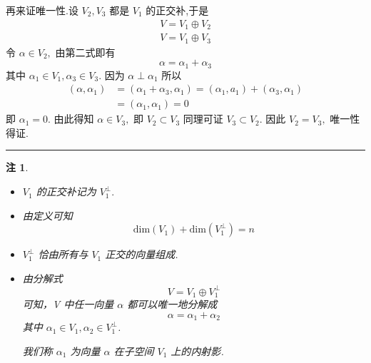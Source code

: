 \documentclass[13pt]{beamer}
\newtheorem*{rem}{注}
\def\qed{\nopagebreak\hfill{\rule{4pt}{7pt}}\medbreak}
\begin{document}
\begin{frame}
再来证唯一性.设 $V_{2}, V_{3}$ 都是 $V_{1}$ 的正交补,于是
\[
\begin{array}{l}
V=V_{1} \oplus V_{2} \\
V=V_{1} \oplus V_{3}
\end{array}
\]
令 ${\alpha} \in V_{2},$ 由第二式即有
\[
{\alpha}={\alpha}_{1}+{\alpha}_{3}
\]
其中 ${\alpha}_{1} \in V_{1}, {\alpha}_{3} \in V_{3} .$ 因为 ${\alpha} \perp {\alpha}_{1}$ 所以
\[
\begin{aligned}
\left({\alpha}, {\alpha}_{1}\right) &=\left({\alpha}_{1}+{\alpha}_{3}, {\alpha}_{1}\right)=\left({\alpha}_{1}, {a}_{1}\right)+\left({\alpha}_{3}, {\alpha}_{1}\right) \\
&=\left({\alpha}_{1}, {\alpha}_{1}\right)=0
\end{aligned}
\]
即 ${\alpha}_{1}={0}$. 
由此得知 ${\alpha} \in V_{3},$ 即 $V_{2} \subset V_{3}$
同理可证 $V_{3} \subset V_{2} .$ 因此 $V_{2}=V_{3},$ 唯一性得证. 
\qed

\end{frame}


\begin{frame}
\begin{rem}
\begin{itemize}
\item $V_{1}$ 的正交补记为 $V_{1}^{\perp} .$ 
\item 由定义可知
$$
\text{dim}\left(V_{1}\right)+\text{dim} \left(V_{1}^{\perp}\right)=n
$$

\item $V_{1}^{\perp}$ 恰由所有与 $V_{1}$ 正交的向量组成.

\item  由分解式
\[
V=V_{1} \oplus V_{1}^{\perp}
\]
可知，V 中任一向量 ${\alpha}$ 都可以唯一地分解成
\[
{\alpha}={\alpha}_{1}+{\alpha}_{2}
\]
其中 ${\alpha}_{1} \in V_{1}, {\alpha}_{2} \in V_{1}^{\perp}$. 

我们称 ${\alpha}_{1}$ 为向量 ${\alpha}$ 在子空间 $V_{1}$ 上的\alert{内射影}.
\end{itemize}
\end{rem}

\end{frame}
\end{document}
